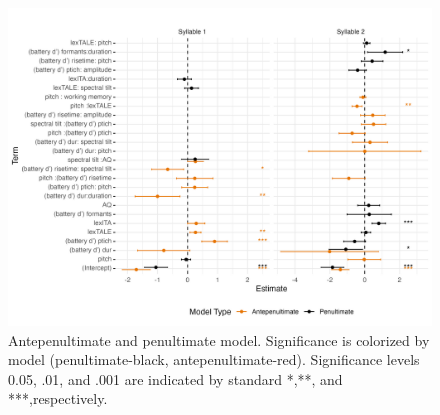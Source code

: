 
\begin{figure}[H]
  \centering
  \includegraphics[width=1\linewidth]{visuals/extended_analysis.jpeg} %
  \caption{Antepenultimate and penultimate model. Significance is colorized by model (penultimate-black, antepenultimate-red). Significance levels 0.05, .01, and .001 are indicated by standard *,**, and ***,respectively.}
  \label{fig:extened_analysis}
\end{figure}


